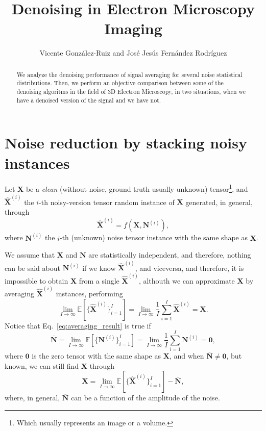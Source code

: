 \documentclass{article}
\title{Denoising in Electron Microscopy Imaging}
\author{Vicente González-Ruiz and José Jesús Fernández Rodríguez}
\begin{document}
\maketitle

\begin{abstract}
  We analyze the denoising performance of signal averaging for several
  noise statistical distributions. Then, we perform an objective
  comparison between some of the denoising algoritms in the field
  of 3D Electron Microscopy, in two situations, when we have a
  denoised version of the signal and we have not.
\end{abstract}

\section{Noise reduction by stacking noisy instances}
Let $\mathbf{X}$ be a \emph{clean} (without noise, ground truth
usually unknown) tensor\footnote{Which usually represents an image or
  a volume.}, and $\hat{\mathbf X}^{(i)}$ the $i$-th noisy-version
tensor random instance of $\mathbf{X}$ generated, in general, through
\begin{equation}
  \hat{\mathbf X}^{(i)} = f(\mathbf{X}, \mathbf{N}^{(i)}),
  \label{eq:general_model}
\end{equation}
where ${\mathbf N}^{(i)}$ the $i$-th (unknown) noise tensor instance
with the same shape as $\mathbf{X}$.

We assume that ${\mathbf X}$ and $\mathbf{N}$ are statistically
independent, and therefore, nothing can be said about
${\mathbf N}^{(i)}$ if we know $\hat{\mathbf X}^{(i)}$, and
viceversa, and therefore, it is impossible to obtain ${\mathbf X}$
from a single $\hat{\mathbf X}^{(i)}$, althouth we can approximate ${\mathbf X}$ by
averaging $\hat{\mathbf X}^{(i)}$ instances, performing
\begin{equation}
  \lim_{I \to \infty} \mathbb{E}\left[\{\hat{\mathbf X}^{(i)}\}_{i=1}^I\right] = \lim_{I \to \infty} \frac{1}{I} \sum_{i=1}^I \hat{\mathbf X}^{(i)} = {\mathbf X}.
  \label{eq:averaging_result}
\end{equation}
Notice that Eq.~\ref{eq:averaging_result} is true if 
\begin{equation}
  \overline{\mathbf N} = \lim_{I \to \infty}{\mathbb E}[\{{\mathbf N^{(i)}}\}_{i=1}^I]=\lim_{I \to \infty}\frac{1}{I} \sum_{i=1}^I {\mathbf N}^{(i)}={\mathbf 0},
  \label{eq:noise_expectation_2}
\end{equation}
where ${\mathbf 0}$ is the zero tensor with the same shape as
$\mathbf{X}$, and when $\overline{\mathbf N}\ne {\mathbf 0}$, but
known, we can still find ${\mathbf X}$ through
\begin{equation}
  {\mathbf X} = \lim_{I \to \infty} \mathbb{E}\left[\{\hat{\mathbf X}^{(i)}\}_{i=1}^I\right]  - \overline{\mathbf N},
  \label{eq:averaging_result_with_bias}
\end{equation}
where, in general, $\overline{\mathbf N}$ can be a function of the
amplitude of the noise.
\end{document}
